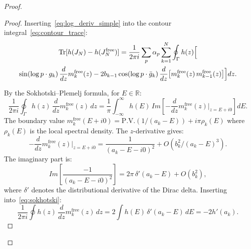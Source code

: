 \documentclass{pre-aomart}
\def\Im{Im}%
\theoremstyle{plain}
\theoremstyle{definition}
\theoremstyle{remark}
\begin{document}
\begin{proof}
\begin{proof}
Inserting~\eqref{eq:log_deriv_simple} into the contour integral~\eqref{eq:contour_trace}:
\begin{multline}\label{eq:trace_h_prime}
\operatorname{Tr}[h(J_N) - h(J_N^{\mathrm{free}})]
= \frac{1}{2\pi i}\sum_p \alpha_p\sum_{k=1}^{N}\oint_\Gamma h(z)\Bigl[\\
  \sin(\log p \cdot g_k)\,\frac{d}{dz}m_k^{\mathrm{free}}(z)
  - 2b_{k-1}\cos(\log p \cdot \bar{g}_k)\,
    \frac{d}{dz}\bigl[m_k^{\mathrm{free}}(z)\,m_{k-1}^{\mathrm{free}}(z)\bigr]
\Bigr]dz.
\end{multline}

By the Sokhotski--Plemelj formula, for $E \in \mathbb{R}$:
\begin{equation}\label{eq:sokhotski}
\frac{1}{2\pi i}\oint_\Gamma h(z)\,\frac{d}{dz}m_k^{\mathrm{free}}(z)\,dz
= \frac{1}{\pi}\int_{-\infty}^{\infty} h(E)\,
  \Im\!\left[-\frac{d}{dz}m_k^{\mathrm{free}}(z)\Big|_{z = E+i0}\right]dE.
\end{equation}
The boundary value $m_k^{\mathrm{free}}(E+i0) = \text{P.V.}(1/(a_k - E)) + i\pi\rho_k(E)$
where $\rho_k(E)$ is the local spectral density.
The $z$-derivative gives:
\begin{equation}\label{eq:m_deriv_formal}
-\frac{d}{dz}m_k^{\mathrm{free}}(z)\Big|_{z=E+i0}
= \frac{1}{(a_k - E - i0)^2} + O(b_k^2/(a_k - E)^3).
\end{equation}
The imaginary part is:
\begin{equation}\label{eq:im_m_deriv_formal}
\Im\!\left[\frac{-1}{(a_k - E - i0)^2}\right]
= 2\pi\,\delta'(a_k - E) + O(b_k^2),
\end{equation}
where $\delta'$ denotes the distributional derivative of the Dirac delta.
Inserting into~\eqref{eq:sokhotski}:
\begin{equation}\label{eq:single_site_formal}
\frac{1}{2\pi i}\oint h(z)\,\frac{d}{dz}m_k^{\mathrm{free}}(z)\,dz
= 2\int h(E)\,\delta'(a_k - E)\,dE = -2h'(a_k).
\end{equation}


\end{proof}
\end{proof}
\end{document}

